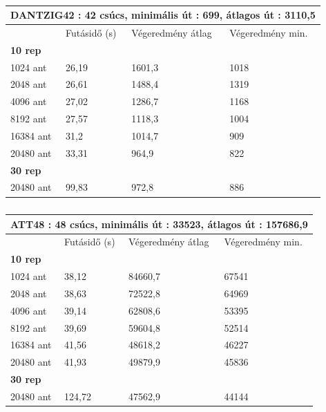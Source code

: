 \begin{table}[ht!]
	\centering
	\begin{tabular}{|p{2cm}||p{3cm}|p{3.5cm}|p{3.5cm}|}
		\hline
		\multicolumn{4}{|c|}{DANTZIG42 : 42 csúcs, minimális út : 699, átlagos út : 3110,5} \\
		\hline
		& Futásidő (s) & Végeredmény átlag & Végeredmény min.\\
		\hline
		\textbf{10 rep} & & & \\
		1024 ant & 26,19 & 1601,3 & 1018\\
		2048 ant & 26,61 & 1488,4 & 1319\\
		4096 ant & 27,02 & 1286,7 & 1168\\
		8192 ant & 27,57 & 1118,3 & 1004\\
		16384 ant & 31,2 & 1014,7 & 909\\
		20480 ant & 33,31 & 964,9 & 822 \\
		\hline
		\textbf{30 rep} & & & \\
		20480 ant & 99,83 & 972,8 & 886 \\
		\hline
	\end{tabular}
	\caption{}
	\label{table:TSPv2_42}
\end{table}


%


\begin{table}[htbp!]
	\centering
	\begin{tabular}{|p{2cm}||p{3cm}|p{3.5cm}|p{3.5cm}|}
		\hline
		\multicolumn{4}{|c|}{ATT48 : 48 csúcs, minimális út : 33523, átlagos út : 157686,9} \\
		\hline
		& Futásidő (s) & Végeredmény átlag & Végeredmény min.\\
		\hline
		\textbf{10 rep} & & & \\
		1024 ant & 38,12 & 84660,7 & 67541 \\
		2048 ant & 38,63 & 72522,8 & 64969 \\
		4096 ant & 39,14 & 62808,6 & 53395 \\
		8192 ant & 39,69 & 59604,8 & 52514 \\
		16384 ant & 41,56 & 48618,2 & 46227 \\
		20480 ant & 41,93 & 49879,9 & 45836\\
		\hline
		\textbf{30 rep} & & & \\
		20480 ant & 124,72 & 47562,9 & 44144 \\
		\hline
	\end{tabular}
	\caption{}
	\label{table:TSPv2_48}
\end{table}


